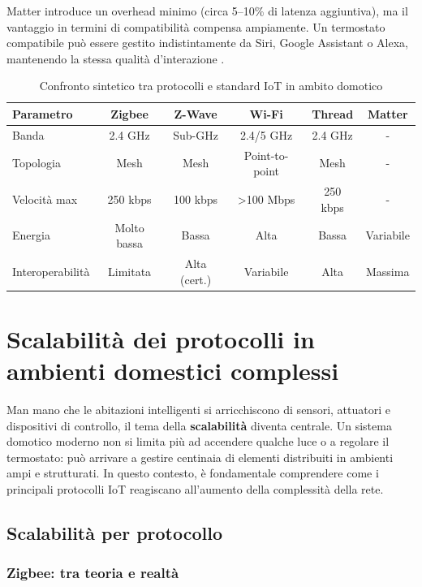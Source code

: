 Matter introduce un overhead minimo (circa 5–10\% di latenza aggiuntiva), ma il vantaggio in termini di compatibilità compensa ampiamente. Un termostato compatibile può essere gestito indistintamente da Siri, Google Assistant o Alexa, mantenendo la stessa qualità d’interazione \cite{MatterWhitePaper}.

\begin{table}[htbp]
\centering
\begin{tabular}{|l|c|c|c|c|c|}
\hline
\textbf{Parametro} & \textbf{Zigbee} & \textbf{Z-Wave} & \textbf{Wi-Fi} & \textbf{Thread} & \textbf{Matter} \\
\hline
Banda & 2.4 GHz & Sub-GHz & 2.4/5 GHz & 2.4 GHz & - \\
Topologia & Mesh & Mesh & Point-to-point & Mesh & - \\
Velocità max & 250 kbps & 100 kbps & \textgreater100 Mbps & 250 kbps & - \\
Energia & Molto bassa & Bassa & Alta & Bassa & Variabile \\
Interoperabilità & Limitata & Alta (cert.) & Variabile & Alta & Massima \\
\hline
\end{tabular}
\caption{Confronto sintetico tra protocolli e standard IoT in ambito domotico}
\label{tab:confronto-protocolli}
\end{table}

\section{Scalabilità dei protocolli in ambienti domestici complessi}

Man mano che le abitazioni intelligenti si arricchiscono di sensori, attuatori e dispositivi di controllo, il tema della \textbf{scalabilità} diventa centrale. Un sistema domotico moderno non si limita più ad accendere qualche luce o a regolare il termostato: può arrivare a gestire centinaia di elementi distribuiti in ambienti ampi e strutturati. In questo contesto, è fondamentale comprendere come i principali protocolli IoT reagiscano all’aumento della complessità della rete.

\subsection{Scalabilità per protocollo}

\subsubsection{Zigbee: tra teoria e realtà}

